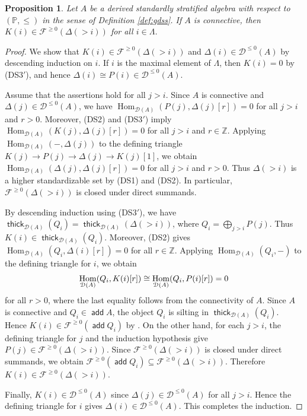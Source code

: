 \documentclass[a4paper,reqno,11pt]{amsart}
\numberwithin{equation}{section}
\newtheorem{proposition}[theorem]{Proposition}
\theoremstyle{definition}
\newcommand{\D}{\mathcal{D}}
\newcommand{\F}{\mathcal{F}}
\newcommand{\ZZ}{\mathbb{Z}}
\newcommand{\PP}{\mathbb{P}}
\newcommand{\bde}{\Delta}
\DeclareMathOperator{\add}{\mathsf{add}}
\DeclareMathOperator{\thick}{\mathsf{thick}}
\DeclareMathOperator{\Hom}{Hom}
\begin{document}
\begin{proposition}\label{prop:gdss_connective}
Let $A$ be a derived standardly stratified algebra with respect to $(\PP,\leq)$ in the sense of Definition \ref{def:gdss}.
If $A$ is connective, then $K(i)\in\F^{\geq 0}(\bde(>i))$ for all $i\in\Lambda$.
\end{proposition}
\begin{proof}
We show that $K(i)\in\F^{\geq 0}(\bde(>i))$ and $\bde(i)\in\D^{\leq 0}(A)$ by descending induction on $i$.
If $i$ is the maximal element of $\Lambda$, then $K(i)=0$ by (DS3$'$), and hence $\bde(i)\cong P(i)\in\D^{\leq 0}(A)$.

Assume that the assertions hold for all $j>i$.
Since $A$ is connective and $\bde(j)\in\D^{\leq 0}(A)$, we have $\Hom_{\D(A)}(P(j),\bde(j)[r])=0$ for all $j>i$ and $r>0$.
Moreover, (DS2) and (DS3$'$) imply $\Hom_{\D(A)}(K(j),\bde(j)[r])=0$ for all $j>i$ and $r\in\ZZ$.
Applying $\Hom_{\D(A)}(-,\bde(j))$ to the defining triangle $K(j)\to P(j)\to\bde(j)\to K(j)[1]$, we obtain $\Hom_{\D(A)}(\bde(j),\bde(j)[r])=0$ for all $j>i$ and $r>0$.
Thus $\bde(>i)$ is a higher standardizable set by (DS1) and (DS2).
In particular, $\F^{\geq 0}(\bde(>i))$ is closed under direct summands.

By descending induction using (DS3$'$), we have $\thick_{\D(A)}(Q_{i})=\thick_{\D(A)}(\bde(>i))$, where $Q_{i}=\bigoplus_{j>i}P(j)$.
Thus $K(i)\in\thick_{\D(A)}(Q_{i})$.
Moreover, (DS2) gives $\Hom_{\D(A)}(Q_{i},\bde(i)[r])=0$ for all $r\in\ZZ$.
Applying $\Hom_{\D(A)}(Q_{i},-)$ to the defining triangle for $i$, we obtain
\begin{align}
\Hom_{\D(A)}(Q_{i},K(i)[r])\cong\Hom_{\D(A)}(Q_{i},P(i)[r])=0\notag
\end{align}
for all $r>0$, where the last equality follows from the connectivity of $A$.
Since $A$ is connective and $Q_{i}\in\add A$, the object $Q_{i}$ is silting in $\thick_{\D(A)}(Q_{i})$.
Hence $K(i)\in\F^{\geq 0}(\add Q_{i})$ by \cite[Proposition 2.8(a) and Lemma 4.1]{IY18}.
On the other hand, for each $j>i$, the defining triangle for $j$ and the induction hypothesis give $P(j)\in\F^{\geq 0}(\bde(>i))$.
Since $\F^{\geq 0}(\bde(>i))$ is closed under direct summands, we obtain $\F^{\geq 0}(\add Q_{i})\subseteq\F^{\geq 0}(\bde(>i))$.
Therefore $K(i)\in\F^{\geq 0}(\bde(>i))$.

Finally, $K(i)\in\D^{\leq 0}(A)$ since $\bde(j)\in\D^{\leq 0}(A)$ for all $j>i$.
Hence the defining triangle for $i$ gives $\bde(i)\in\D^{\leq 0}(A)$.
This completes the induction.
\end{proof}
\end{document}
